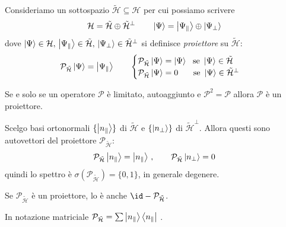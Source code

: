 \begin{definition}
    Consideriamo un sottospazio \(\tilde{\mathcal{H}}\subseteq \mathcal{H}\) per cui possiamo scrivere 
    \begin{equation}
        \mathcal{H} = \tilde{\mathcal{H}} \oplus \tilde{\mathcal{H}}^\perp \qquad 
        \ket{\Psi} = \ket{\Psi_\parallel} \oplus \ket{\Psi_\perp}
    \end{equation}
    dove \(\ket{\Psi} \in \mathcal{H},\,\ket{\Psi_\parallel} \in\tilde{\mathcal{H}},\, \ket{\Psi_\perp}\in\tilde{\mathcal{H}}^\perp\) si definisce
    \textit{proiettore} su \(\tilde{\mathcal{H}}\):
    \begin{equation}
        \mathcal{P}_{\tilde{\mathcal{H}}}\ket{\Psi}= \ket{\Psi_\parallel} \qquad 
    \begin{cases}
        \mathcal{P}_{\tilde{\mathcal{H}}} \ket{\Psi}= \ket{\Psi}   \ \text{ se } \ket{\Psi} \in  \tilde{\mathcal{H}}\\
        \mathcal{P}_{\tilde{\mathcal{H}}} \ket{\Psi}= 0   \quad \, \ \text{ se } \ket{\Psi} \in  \tilde{\mathcal{H}}^\perp
    \end{cases}
    \end{equation}
\end{definition}

\begin{theorem}
    Se e solo se un operatore \(\mathcal{P}\) è limitato, autoaggiunto e \(\mathcal{P}^2=\mathcal{P}\) allora \(\mathcal{P}\) è un proiettore.
\end{theorem}

Scelgo basi ortonormali \(\{\ket{n_\parallel}\}\) di \(\tilde{\mathcal{H}}\) e \(\{\ket{n_\perp}\}\) di \(\tilde{\mathcal{H}}^{\perp}\).
Allora questi sono autovettori del proiettore \(\mathcal{P}_{\tilde{\mathcal{H}}}\):
\[
    \mathcal{P}_{\tilde{\mathcal{H}}}\ket{n_\parallel}= \ket{n_\parallel}\,,\qquad
    \mathcal{P}_{\tilde{\mathcal{H}}}\ket{n_\perp}= 0
\]
quindi lo spettro è \(\sigma(\mathcal{P}_{\tilde{\mathcal{H}}})= \{0,1\}\), in generale degenere.

\begin{remark}
    Se \(\mathcal{P}_{\tilde{\mathcal{H}}} \) è un proiettore, lo è anche \(\id- \mathcal{P}_{\tilde{\mathcal{H}}}\).
\end{remark}
\begin{remark}
    In notazione matriciale \(\mathcal{P}_{\tilde{\mathcal{H}}}= \sum \ket{n_\parallel}\bra{n_\parallel}\) .
\end{remark}


